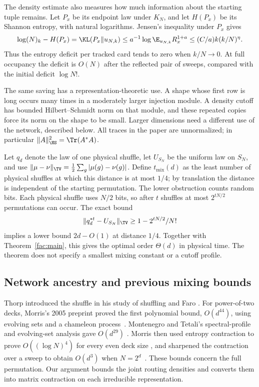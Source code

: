 The density estimate also measures how much information about the
starting tuple remains. Let $P_x$ be its endpoint law under $K_N$, and
let $H(P_x)$ be its Shannon entropy, with natural logarithms. Jensen's
inequality under $P_x$ gives
\[
 \log (N)_k-H(P_x)=\KL(P_x\|u_{N,k})
 \le a^{-1}\log\E_{u_{N,k}}R_x^{1+a}
 \le (C/a)k(k/N)^\eta.
\]
Thus the entropy deficit per tracked card tends to zero when $k/N\to0$.
At full occupancy the deficit is $O(N)$ after the reflected pair of
sweeps, compared with the initial deficit $\log N!$.

The same saving has a representation-theoretic use. A shape whose first
row is long occurs many times in a moderately larger injection module.
A density cutoff has bounded Hilbert--Schmidt norm on that module, and
these repeated copies force its norm on the shape to be small. Larger
dimensions need a different use of the network, described below. All
traces in the paper are unnormalized; in particular
$\|A\|_{\HS}^2=\Tr(A^*A)$.

Let $q_d$ denote the law of one physical shuffle, let $U_{S_N}$ be the uniform law on $S_N$, and use $\|\mu-\nu\|_{\TV}=\frac12\sum_g|\mu(g)-\nu(g)|$. Define $t_{\mathrm{mix}}(d)$ as the least number of physical shuffles at which this distance is at most $1/4$; by translation the distance is independent of the starting permutation. The lower obstruction counts random bits. Each physical shuffle uses
$N/2$ bits, so after $t$ shuffles at most $2^{tN/2}$ permutations can
occur. The exact bound
\[
 \|q_d^{*t}-U_{S_N}\|_{\TV}\ge1-2^{tN/2}/N!
\]
implies a lower bound $2d-O(1)$ at distance $1/4$.
Together with Theorem~\ref{fac:main}, this gives the optimal order
$\Theta(d)$ in physical time. The theorem does not specify a smallest
mixing constant or a cutoff profile.

\subsection{Network ancestry and previous mixing bounds}
Thorp introduced the shuffle in his study of shuffling and Faro
\cite{Thorp1973}. For power-of-two decks, Morris's 2005 preprint proved
the first polynomial bound, $O(d^{44})$, using evolving sets and a
chameleon process~\cite{Morris2008}. Montenegro and Tetali's
spectral-profile and evolving-set analysis gave $O(d^{29})$
\cite[Theorems 6.14--6.15]{MontenegroTetali2006}. Morris then used
entropy contraction to prove $O((\log N)^4)$ for every even deck size
\cite{Morris2009}, and sharpened the contraction over a sweep to obtain
$O(d^3)$ when $N=2^d$~\cite[Lemma 7 and Theorem 8]{Morris2013}.
These bounds concern the full permutation. Our argument bounds the
joint routing densities and converts them into matrix contraction on
each irreducible representation.

